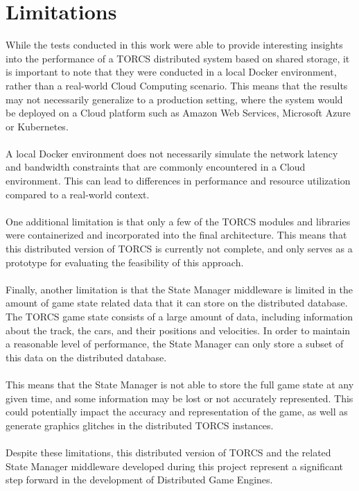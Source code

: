 \section{Limitations}
While the tests conducted in this work were able to provide interesting insights into the performance of a TORCS distributed system based on shared storage, it is important to note that they were conducted in a local Docker environment, rather than a real-world Cloud Computing scenario. This means that the results may not necessarily generalize to a production setting, where the system would be deployed on a Cloud platform such as Amazon Web Services, Microsoft Azure or Kubernetes. \\ \\
A local Docker environment does not necessarily simulate the network latency and bandwidth constraints that are commonly encountered in a Cloud environment. This can lead to differences in performance and resource utilization compared to a real-world context. \\ \\
One additional limitation is that only a few of the TORCS modules and libraries were containerized and incorporated into the final architecture. This means that this distributed version of TORCS is currently not complete, and only serves as a prototype for evaluating the feasibility of this approach. \\ \\
Finally, another limitation is that the State Manager middleware is limited in the amount of game state related data that it can store on the distributed database. The TORCS game state consists of a large amount of data, including information about the track, the cars, and their positions and velocities. In order to maintain a reasonable level of performance, the State Manager can only store a subset of this data on the distributed database. \\ \\
This means that the State Manager is not able to store the full game state at any given time, and some information may be lost or not accurately represented. This could potentially impact the accuracy and representation of the game, as well as generate graphics glitches in the distributed TORCS instances. \\ \\
Despite these limitations, this distributed version of TORCS and the related State Manager middleware developed during this project represent a significant step forward in the development of Distributed Game Engines.

